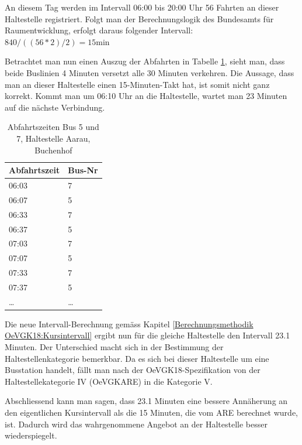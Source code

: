An diesem Tag werden im Intervall 06:00 bis 20:00 Uhr 56 Fahrten an dieser Haltestelle registriert.
Folgt man der Berechnungslogik des Bundesamts für Raumentwicklung, erfolgt daraus folgender Intervall:
$ 840 / ((56 * 2) / 2) = 15 \text{min}$

Betrachtet man nun einen Auszug der Abfahrten in Tabelle \ref{table:Abfahrtszeiten Aarau, Buchenhof}, sieht man, dass beide Buslinien 4 Minuten versetzt alle 30 Minuten verkehren.
Die Aussage, dass man an dieser Haltestelle einen 15-Minuten-Takt hat, ist somit nicht ganz korrekt.
Kommt man um 06:10 Uhr an die Haltestelle, wartet man 23 Minuten auf die nächste Verbindung.

\begin{table}[H]
    \centering
    \begin{tabular}[c]{l l}
        \toprule
        \textbf{Abfahrtszeit}   & \textbf{Bus-Nr}\\
        \midrule
        06:03                   & 7\\
        06:07                   & 5\\
        06:33                   & 7\\
        06:37                   & 5\\
        07:03                   & 7\\
        07:07                   & 5\\
        07:33                   & 7\\
        07:37                   & 5\\
        \dots                   & \dots\\
        \bottomrule
    \end{tabular}
    \caption{Abfahrtszeiten Bus 5 und 7, Haltestelle Aarau, Buchenhof}
    \label{table:Abfahrtszeiten Aarau, Buchenhof}
\end{table}

Die neue Intervall-Berechnung gemäss Kapitel \ref{Berechnungsmethodik OeVGK18:Kursintervall} ergibt nun für die gleiche Haltestelle den Intervall 23.1 Minuten.
Der Unterschied macht sich in der Bestimmung der Haltestellenkategorie bemerkbar.
Da es sich bei dieser Haltestelle um eine Busstation handelt, fällt man nach der OeVGK18-Spezifikation von der Haltestellekategorie IV (OeVGKARE) in die Kategorie V.

Abschliessend kann man sagen, dass 23.1 Minuten eine bessere Annäherung an den eigentlichen Kursintervall als die 15 Minuten, die vom \acs{ARE} berechnet wurde, ist.
Dadurch wird das wahrgenommene Angebot an der Haltestelle besser wiederspiegelt.

